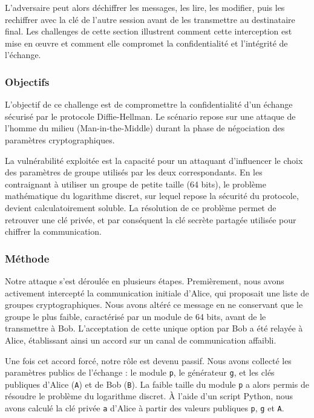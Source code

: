     L'adversaire peut alors déchiffrer les messages, les lire, les modifier, puis
    les rechiffrer avec la clé de l'autre session avant de les transmettre au
    destinataire final. Les challenges de cette section illustrent comment
    cette interception est mise en œuvre et comment elle compromet la
    confidentialité et l'intégrité de l'échange.

    \subsubsection{Objectifs}
    L'objectif de ce challenge est de compromettre la confidentialité d'un
    échange sécurisé par le protocole Diffie-Hellman. Le scénario repose sur
    une attaque de l'homme du milieu (Man-in-the-Middle) durant la phase de
    négociation des paramètres cryptographiques.

    La vulnérabilité exploitée est la capacité pour un attaquant d'influencer
    le choix des paramètres de groupe utilisés par les deux correspondants. En
    les contraignant à utiliser un groupe de petite taille (64 bits), le
    problème mathématique du logarithme discret, sur lequel repose la sécurité
    du protocole, devient calculatoirement soluble. La résolution de ce
    problème permet de retrouver une clé privée, et par conséquent la clé
    secrète partagée utilisée pour chiffrer la communication.

    \subsubsection{Méthode}
    Notre attaque s'est déroulée en plusieurs étapes. Premièrement, nous avons
    activement intercepté la communication initiale d'Alice, qui proposait une
    liste de groupes cryptographiques. Nous avons altéré ce message en ne
    conservant que le groupe le plus faible, caractérisé par un module de 64
    bits, avant de le transmettre à Bob. L'acceptation de cette unique option
    par Bob a été relayée à Alice, établissant ainsi un accord sur un canal de
    communication affaibli.

    Une fois cet accord forcé, notre rôle est devenu passif. Nous avons
    collecté les paramètres publics de l'échange : le module \texttt{p}, le
    générateur \texttt{g}, et les clés publiques d'Alice (\texttt{A}) et de
    Bob (\texttt{B}). La faible taille du module \texttt{p} a alors permis de
    résoudre le problème du logarithme discret. À l'aide d'un script Python, nous
    avons calculé la clé privée \texttt{a} d'Alice à partir des valeurs publiques
    \texttt{p}, \texttt{g} et \texttt{A}.

